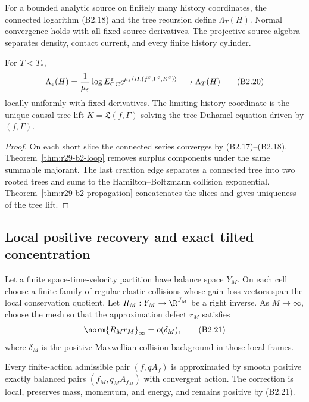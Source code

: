 For a bounded analytic source on finitely many history coordinates, the
connected logarithm (B2.18) and the tree recursion define
$\Lambda_T(H)$.  Normal convergence holds with all fixed source derivatives.
The projective source algebra separates density, contact current, and every
finite history cylinder.

\begin{theorem}
\label{thm:r29-b2-pressure}
For $T<T_*$,
\[
 \Lambda_\varepsilon(H)={1\over\mu_\varepsilon}
 \log E_{\rm GC}^\varepsilon e^{\mu_\varepsilon\langle H,
 (f^\varepsilon,\Gamma^\varepsilon,K^\varepsilon)\rangle}
 \longrightarrow\Lambda_T(H)                            \tag{B2.20}
\]
locally uniformly with fixed derivatives.  The limiting history coordinate is
the unique causal tree lift $K=\mathfrak L(f,\Gamma)$ solving the tree Duhamel
equation driven by $(f,\Gamma)$.
\end{theorem}

\begin{proof}
On each short slice the connected series converges by (B2.17)--(B2.18).
Theorem~\ref{thm:r29-b2-loop} removes surplus components under the same
summable majorant.  The last creation edge separates a connected tree into two
rooted trees and sums to the Hamilton--Boltzmann collision exponential.
Theorem~\ref{thm:r29-b2-propagation} concatenates the slices and gives
uniqueness of the tree lift.
\end{proof}

\subsection{Local positive recovery and exact tilted concentration}

Let a finite space-time-velocity partition have balance space $Y_M$.  On each
cell choose a finite family of regular elastic collisions whose gain--loss
vectors span the local conservation quotient.  Let $R_M:Y_M\to\R^{J_M}$ be a
right inverse.  As $M\to\infty$, choose the mesh so that the approximation
defect $r_M$ satisfies
\[
 \norm{R_Mr_M}_\infty=o(\delta_M),                        \tag{B2.21}
\]
where $\delta_M$ is the positive Maxwellian collision background in those
local frames.

\begin{lemma}
\label{lem:r29-b2-recovery}
Every finite-action admissible pair $(f,qA_f)$ is approximated by smooth
positive exactly balanced pairs $(f_M,q_MA_{f_M})$ with convergent action.
The correction is local, preserves mass, momentum, and energy, and remains
positive by (B2.21).
\end{lemma}

